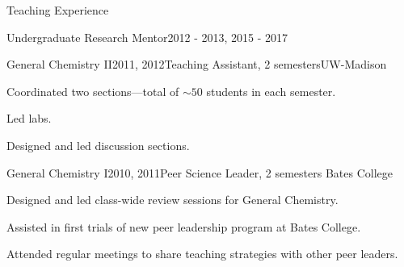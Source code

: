 \documentclass{resume}  %
\begin{document}
\begin{rSection}{Teaching Experience}
\begin{rSubsection}{Undergraduate Research Mentor}{2012 - 2013, 2015 - 2017}
  \end{rSubsection}
  \begin{rSubsection}{General Chemistry II}{2011, 2012}{Teaching Assistant, 2
      semesters}{UW-Madison}
    \item Coordinated two sections---total of $\sim50$ students in each semester.
    \item Led labs.
    \item Designed and led discussion sections.
  \end{rSubsection}
  \begin{rSubsection}{General Chemistry I}{2010, 2011}{Peer Science Leader, 2 semesters}
    {Bates College}
    \item Designed and led class-wide review sessions for General Chemistry.
    \item Assisted in first trials of new peer leadership program at Bates College.
    \item Attended regular meetings to share teaching strategies with other peer leaders.
  \end{rSubsection}
\end{rSection}

\pagebreak
\end{document}
